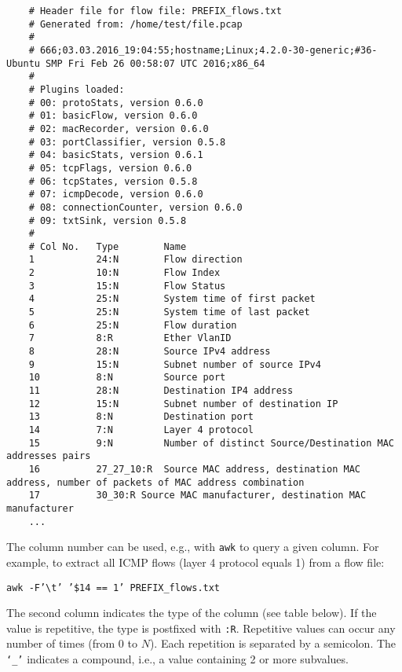 \documentclass[documentation]{subfiles}
\begin{document}
\begin{lstlisting}
    # Header file for flow file: PREFIX_flows.txt
    # Generated from: /home/test/file.pcap
    #
    # 666;03.03.2016_19:04:55;hostname;Linux;4.2.0-30-generic;#36-Ubuntu SMP Fri Feb 26 00:58:07 UTC 2016;x86_64
    #
    # Plugins loaded:
    # 00: protoStats, version 0.6.0
    # 01: basicFlow, version 0.6.0
    # 02: macRecorder, version 0.6.0
    # 03: portClassifier, version 0.5.8
    # 04: basicStats, version 0.6.1
    # 05: tcpFlags, version 0.6.0
    # 06: tcpStates, version 0.5.8
    # 07: icmpDecode, version 0.6.0
    # 08: connectionCounter, version 0.6.0
    # 09: txtSink, version 0.5.8
    #
    # Col No.   Type        Name
    1           24:N        Flow direction
    2           10:N        Flow Index
    3           15:N        Flow Status
    4           25:N        System time of first packet
    5           25:N        System time of last packet
    6           25:N        Flow duration
    7           8:R         Ether VlanID
    8           28:N        Source IPv4 address
    9           15:N        Subnet number of source IPv4
    10          8:N         Source port
    11          28:N        Destination IP4 address
    12          15:N        Subnet number of destination IP
    13          8:N         Destination port
    14          7:N         Layer 4 protocol
    15          9:N         Number of distinct Source/Destination MAC addresses pairs
    16          27_27_10:R  Source MAC address, destination MAC address, number of packets of MAC address combination
    17          30_30:R Source MAC manufacturer, destination MAC manufacturer
    ...
\end{lstlisting}

The column number can be used, e.g., with {\tt awk} to query a given column.
For example, to extract all ICMP flows (layer 4 protocol equals 1) from a flow file:
\begin{center}
{\tt awk -F'\textbackslash{}t' '\$14 == 1' PREFIX\_flows.txt}
\end{center}
The second column indicates the type of the column (see table below).
If the value is repetitive, the type is postfixed with {\tt :R}.
Repetitive values can occur any number of times (from 0 to $N$).
Each repetition is separated by a semicolon.
The {\tt `\_'} indicates a compound, i.e., a value containing 2 or more subvalues.
\end{document}
